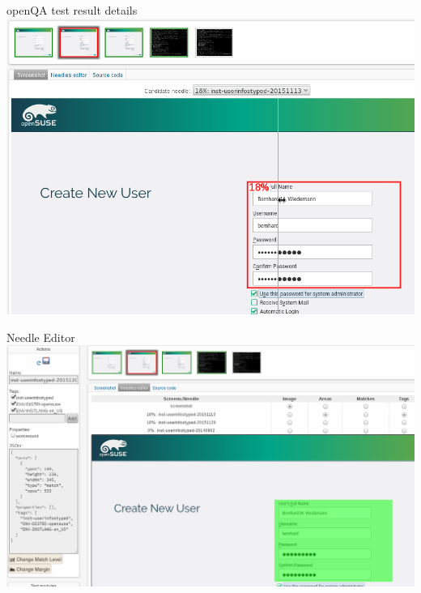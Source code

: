 \documentclass[
]{beamer}
\begin{document}
\begin{frame}{openQA test result details }
  \includegraphics[width=.8\paperwidth]{openqa-fail4.png}
\end{frame}


\begin{frame}{Needle Editor}
  \includegraphics[width=.8\paperwidth]{openqa-needle-editor1.png}
\end{frame}
\end{document}
